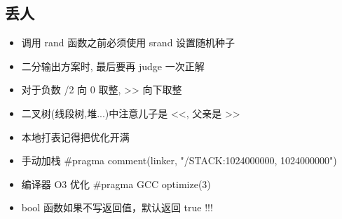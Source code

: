 \subsection{丢人}

\begin{itemize}
    \item 调用 rand 函数之前必须使用 srand 设置随机种子
    \item 二分输出方案时, 最后要再 judge 一次正解
    \item 对于负数 /2 向 0 取整, >> 向下取整
    \item 二叉树(线段树,堆...)中注意儿子是 <<, 父亲是 >>
    \item 本地打表记得把优化开满
    \item 手动加栈 \#pragma comment(linker, "/STACK:1024000000, 1024000000")
    \item 编译器 O3 优化 \#pragma GCC optimize(3)
    \item bool 函数如果不写返回值，默认返回 true !!!
\end{itemize}
